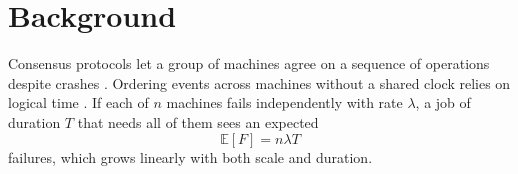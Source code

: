 \chapter{Background}
\label{ch:background}

Consensus protocols let a group of machines agree on a sequence of operations despite crashes
\citep{lamport1998paxos, ongaro2014}. Ordering events across machines without a shared clock
relies on logical time \citep{lamport1978}. If each of $n$ machines fails independently with rate
$\lambda$, a job of duration $T$ that needs all of them sees an expected
\begin{equation}
  \mathbb{E}[F] = n \lambda T
  \label{eq:failures}
\end{equation}
failures, which grows linearly with both scale and duration.
